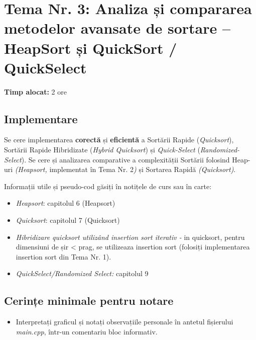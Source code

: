 \documentclass[../ro-fa-lab.tex]{subfiles}
\begin{document}
\section{\texorpdfstring{\textbf{Tema Nr. 3: Analiza și compararea metodelor avansate de sortare
-- HeapSort și QuickSort / QuickSelect}}{Tema Nr. 3: Analiza și compararea metodelor avansate de sortare
-- HeapSort și QuickSort / QuickSelect}}\label{assign3}


\textbf{Timp alocat:} 2 ore

\subsection{Implementare}\label{implementare}

Se cere implementarea \textbf{corectă} și \textbf{eficientă} a Sortării
Rapide (\emph{Quicksort}), Sortării Rapide Hibridizate (\emph{Hybrid
Quicksort}) și \emph{Quick-Select} (\emph{Randomized-Select}). Se cere
și analizarea comparative a complexității Sortării folosind Heap-uri
\emph{(Heapsort,} implementat în Tema Nr. 2\emph{)} și Sortarea Rapidă
\emph{(Quicksort)}.

Informații utile și pseudo-cod găsiți în notițele de curs
sau în carte\citep{cormen}:

\begin{itemize}
\item
  \emph{Heapsort}: capitolul 6 (Heapsort)
\item
  \emph{Quicksort}: capitolul 7 (Quicksort)
\item
  \emph{Hibridizare quicksort utilizând insertion sort
  iterativ -} in quicksort, pentru dimensiuni de șir \textless{} prag,
  se utilizeaza insertion sort (folosiți implementarea insertion sort
  din Tema Nr. 1).
\item
  \emph{QuickSelect/Randomized Select:} capitolul 9
\end{itemize}

\subsection{Cerințe minimale pentru
notare}\label{cerinux21be-minimale-pentru-notare}

\begin{itemize}
\item
  Interpretați graficul și notați observațiile personale în antetul
  fișierului \emph{main.cpp}, într-un comentariu bloc informativ.
\end{itemize}
\end{document}
